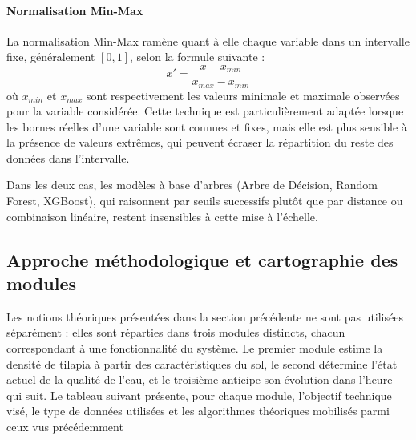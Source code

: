 \documentclass[a4paper,12pt, oneside]{article}
\begin{document}
\paragraph{Normalisation Min-Max\\}
La normalisation Min-Max ramène quant à elle chaque variable dans un intervalle fixe, généralement $[0,1]$, selon la formule suivante :
\[
x' = \frac{x - x_{min}}{x_{max} - x_{min}}
\]
où $x_{min}$ et $x_{max}$ sont respectivement les valeurs minimale et maximale observées pour la variable considérée. Cette technique est particulièrement adaptée lorsque les bornes réelles d'une variable sont connues et fixes, mais elle est plus sensible à la présence de valeurs extrêmes, qui peuvent écraser la répartition du reste des données dans l'intervalle.

Dans les deux cas, les modèles à base d'arbres (Arbre de Décision, Random Forest, XGBoost), qui raisonnent par seuils successifs plutôt que par distance ou combinaison linéaire, restent insensibles à cette mise à l'échelle.


\subsection{Approche méthodologique et cartographie des modules}

Les notions théoriques présentées dans la section précédente ne sont pas utilisées séparément : elles sont réparties dans trois modules distincts, chacun correspondant à une fonctionnalité du système. Le premier module estime la densité de tilapia à partir des caractéristiques du sol, le second détermine l'état actuel de la qualité de l'eau, et le troisième anticipe son évolution dans l'heure qui suit. Le tableau suivant présente, pour chaque module, l'objectif technique visé, le type de données utilisées et les algorithmes théoriques mobilisés parmi ceux vus précédemment
\end{document}
